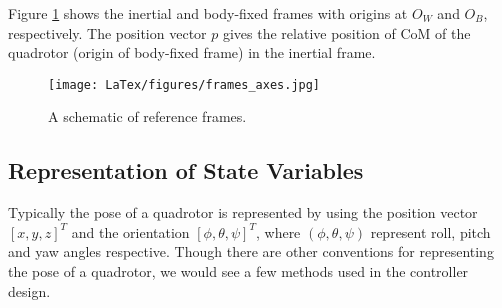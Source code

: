 Figure \ref{fig:frames} shows the inertial and body-fixed frames with origins at $O_W$ and $O_B$, respectively. The position vector $p$ gives the relative position of CoM of the quadrotor (origin of body-fixed frame) in the inertial frame.

\begin{figure}
	\centering
	\texttt{[image: LaTex/figures/frames\_axes.jpg]}
	\caption{{A schematic of reference frames.}}\label{fig:frames}
\end{figure}

\subsection{Representation of State Variables}
Typically the pose of a quadrotor is represented by using the position vector $[x, y, z]^T$ and the orientation $[\phi, \theta, \psi]^T$, where $(\phi, \theta, \psi)$ represent roll, pitch and yaw angles respective. Though there are other conventions for representing the pose of a quadrotor, we would see a few methods used in the controller design. 




